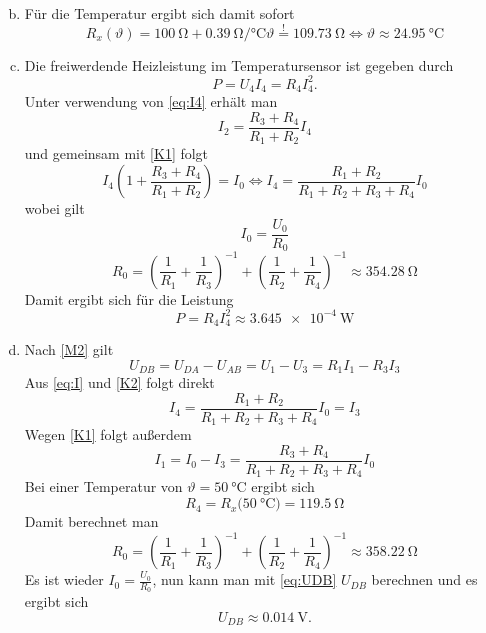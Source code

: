 \begin{enumerate}[(a)]
\begin{equation}
\end{equation}
\item
Für die Temperatur ergibt sich damit sofort
\begin{equation}
	R_{x}(\vartheta) = \SI{100}{\ohm} + \SI[per-mode=fraction]{0.39}{\ohm\per\degreeCelsius} \vartheta \overset{!}{=} \SI{109,73}{\ohm} \Leftrightarrow \vartheta \approx \SI{24.95}{\degreeCelsius}
\end{equation}
\item
Die freiwerdende Heizleistung im Temperatursensor ist gegeben durch
\begin{equation}
	P = U_4 I_4 = R_4 I_{4}^{2}.
\end{equation}
Unter verwendung von \ref{eq:I4} erhält man
\begin{equation}
	I_2  = \frac{R_3 + R_4}{R_1 + R_2} I_4
\end{equation}
und gemeinsam mit \ref{K1} folgt
\begin{equation}
	I_4  \left( 1 +\frac{R_3 + R_4}{R_1 + R_2} \right) = I_0 \Leftrightarrow I_4 = \frac{R_1 + R_2}{R_1 + R_2 + R_3 + R_4}I_0 \label{eq:I}
\end{equation}
wobei gilt
\begin{equation}
	I_0 = \frac{U_0}{R_0} 
\end{equation}
\begin{equation}
	R_0 = \left(\frac{1}{R_1} + \frac{1}{R_3} \right)^{-1} + \left(\frac{1}{R_2} + \frac{1}{R_4} \right)^{-1} \approx \SI{354.28}{\ohm}
\end{equation}
Damit ergibt sich für die Leistung
\begin{equation}
	P = R_4 I_4^2 \approx \SI{3.645e-4}{\watt}
\end{equation}
\item
Nach \ref{M2} gilt
\begin{equation}
	U_{DB} = U_{DA} - U_{AB} = U_1 - U_3 = R_1 I_1 - R_3 I_3 \label{eq:UDB}
\end{equation}
Aus \ref{eq:I} und \ref{K2} folgt direkt
\begin{equation}
	I_4 = \frac{R_1 + R_2}{R_1 + R_2 + R_3 + R_4}I_0 = I_3
\end{equation}
Wegen \ref{K1} folgt außerdem
\begin{equation}
	I_1 = I_0 - I_3 = \frac{R_3 + R_4}{R_1 + R_2 + R_3 + R_4}I_0
\end{equation}
Bei einer Temperatur von $\vartheta = \SI{50}{\degreeCelsius}$ ergibt sich
\begin{equation}
	R_4 = R_x(\SI{50}{\degreeCelsius)} = \SI{119.5}{\ohm}
\end{equation}
Damit berechnet man
\begin{equation}
	R_0 = \left(\frac{1}{R_1} + \frac{1}{R_3} \right)^{-1} + \left(\frac{1}{R_2} + \frac{1}{R_4} \right)^{-1} \approx \SI{358.22}{\ohm}
\end{equation}
Es ist wieder $I_0 = \frac{U_0}{R_0}$, nun kann man mit \ref{eq:UDB} $U_{DB}$ berechnen und es ergibt sich
\begin{equation}
	U_{DB} \approx \SI{0.014}{\volt}.
\end{equation}
\end{enumerate}










